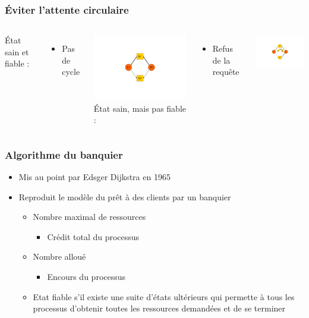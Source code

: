 \begin{frame}
\frametitle{Éviter l’attente circulaire}
\begin{columns}
État sain et fiable :
\begin{itemize}
\item Pas de cycle
\end{itemize}
\includegraphics[width=5cm]{../illustration/ga_pas_cycle.pdf}
État sain, mais pas fiable :
\begin{itemize}
\item Refus de la requête
\end{itemize}
\includegraphics[width=5cm]{../illustration/ga_cycle.pdf}
\end{columns}
\end{frame}

\begin{frame}
\frametitle{Algorithme du banquier}
\begin{itemize}
\item Mis au point par Edsger Dijkstra en 1965
\item Reproduit le modèle du prêt à des clients par un banquier
\begin{itemize}
\item Nombre maximal de ressources
\begin{itemize}
\item Crédit total du processus
\end{itemize}
\item Nombre alloué
\begin{itemize}
\item Encours du processus
\end{itemize}
\item Etat fiable s'il existe une suite d'états ultérieurs qui permette à tous les processus d'obtenir toutes les ressources demandées et de se terminer
\end{itemize}
\end{itemize}
\end{frame}

